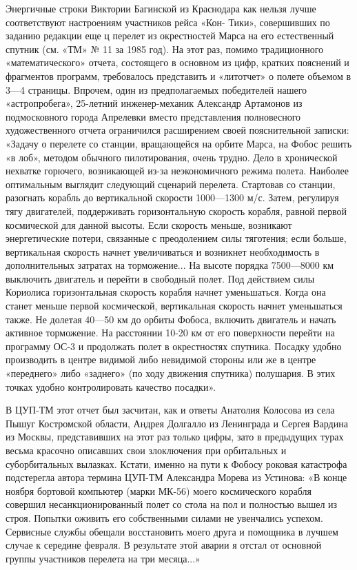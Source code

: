 \documentclass[11pt,a4paper,oneside]{article}
\begin{document}
Энергичные строки Виктории Багинской из Краснодара как нельзя лучше соответствуют настроениям участников рейса «Кон- Тики», совершивших по заданию редакции еще ц перелет из окрестностей Марса на его естественный спутник (см. «ТМ» №	11 за
1985 год). На этот раз, помимо традиционного «математического» отчета, состоящего в основном из цифр, кратких пояснений и фрагментов программ, требовалось представить и «литотчет» о полете объемом в 3—4 страницы. Впрочем, один из предполагаемых победителей нашего «астропробега», 25-летний инженер-механик Александр Артамонов из подмосковного города Апрелевки вместо представления полновесного художественного отчета ограничился расширением своей пояснительной записки: «Задачу о перелете со станции, вращающейся на орбите Марса, на Фобос решить «в лоб», методом обычного пилотирования, очень трудно. Дело в хронической нехватке горючего, возникающей из-за неэкономичного режима полета. Наиболее оптимальным выглядит следующий сценарий перелета. Стартовав со станции, разогнать корабль до вертикальной скорости 1000—1300 м/с. Затем, регулируя тягу двигателей, поддерживать горизонтальную скорость корабля, равной первой космической для данной высоты. Если скорость меньше, возникают энергетические потери, связанные с преодолением силы тяготения; если больше, вертикальная скорость начнет увеличиваться и возникнет необходимость в дополнительных затратах на торможение... На высоте порядка 7500—8000 км выключить двигатель и перейти в свободный полет. Под действием силы Кориолиса горизонтальная скорость корабля начнет уменьшаться. Когда она станет меньше первой космической, вертикальная скорость начнет уменьшаться также. Не долетая 40—50 км до орбиты Фобоса, включить двигатель и начать активное торможение. На расстоянии 10-20 км от его поверхности перейти на программу ОС-3 и продолжать полет в окрестностях спутника. Посадку удобно производить в центре видимой либо невидимой стороны или же в центре «переднего» либо «заднего» (по ходу движения спутника) полушария. В этих точках удобно контролировать качество посадки».

В ЦУП-ТМ этот отчет был засчитан, как и ответы Анатолия Колосова из села Пышуг Костромской области, Андрея Долгалло из Ленинграда и Сергея Вардина из Москвы, представивших на этот раз только цифры, зато в предыдущих турах весьма красочно описавших свои злоключения при орбитальных и суборбитальных вылазках. Кстати, именно на пути к Фобосу роковая катастрофа подстерегла автора термина ЦУП-ТМ Александра Морева из Устинова: «В конце ноября бортовой компьютер (марки МК-56) моего космического корабля совершил несанкционированный полет со стола на пол и полностью вышел из строя. Попытки оживить его собственными силами не увенчались успехом. Сервисные службы обещали восстановить моего друга и помощника в лучшем случае к середине февраля. В результате этой аварии я отстал от основной группы участников перелета на три месяца...»
\end{document}

